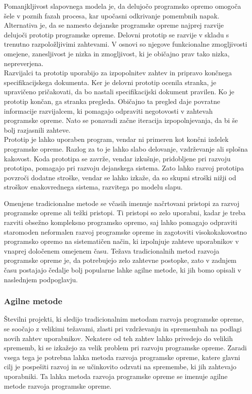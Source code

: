 \documentclass[a4paper,12pt,openright]{book}
\begin{document}
Pomanjkljivost slapovnega modela je, da delujočo programsko opremo omogoča šele v poznih fazah procesa, kar upočasni odkrivanje pomembnih napak. Alternativa je, da se namesto dejanske programske opreme najprej razvije delujoči prototip programske opreme. Delovni prototip se razvije v skladu s trenutno razpoložljivimi zahtevami. V osnovi so njegove  funkcionalne zmogljivosti omejene, zanesljivost je nizka in zmogljivost, ki je običajno prav tako nizka, nepreverjena. \\
Razvijalci ta prototip uporabijo za izpopolnitev zahtev in pripravo končnega specifikacijskega dokumenta. Ker je delovni prototip ocenila stranka, je upravičeno pričakovati, da bo nastali specifikacijski dokument pravilen. Ko je prototip končan, ga stranka pregleda. Običajno ta pregled daje povratne informacije razvijalcem, ki pomagajo odpraviti negotovosti v zahtevah programske opreme. Nato se ponavadi začne iteracija izpopolnjevanja, da bi še bolj razjasnili zahteve. \\
Prototip je lahko uporaben program, vendar ni primeren kot končni izdelek programske opreme. Razlog za to je lahko slabo delovanje, vzdrževanje ali splošna kakovost. Koda prototipa se zavrže, vendar izkušnje, pridobljene pri razvoju prototipa, pomagajo pri razvoju dejanskega sistema. Zato lahko razvoj prototipa povzroči dodatne stroške, vendar se lahko izkaže, da so skupni stroški nižji od stroškov enakovrednega sistema, razvitega po modelu slapu. \cite{aggarwal2005software}

Omenjene tradicionalne metode se včasih imenuje načrtovani pristopi za razvoj programske opreme ali težki pristopi. Ti pristopi so zelo uporabni, kadar je treba razviti obsežno kompleksno programsko opremo, saj lahko pomagajo odpraviti staromoden neformalen razvoj programske opreme in zagotoviti visokokakovostno programsko opremo na sistematičen način, ki izpolnjuje zahteve uporabnikov v vnaprej določenem omejenem času. Težava tradicionalnih metod razvoja programske opreme je, da potrebujejo zelo zahtevne postopke, zato v zadnjem času postajajo čedalje bolj popularne lahke agilne metode, ki jih bomo opisali v naslednjem podpoglavju.


\subsubsection{Agilne metode}
\sloppy
Številni projekti, ki sledijo tradicionalnim metodam razvoja programske opreme, se soočajo z velikimi težavami, zlasti pri vzdrževanju in spremembah na podlagi novih zahtev uporabnikov. Nekatere od teh zahtev lahko privedejo do velikih sprememb, ki se izkažejo za velik problem pri razvoju programske opreme.  Zaradi vsega tega je potrebna lahka metoda razvoja programske opreme, katere glavni cilj je pospešiti razvoj in se učinkovito odzvati na spremembe, ki jih zahtevajo uporabniki. Ta lahka metoda razvoja programske opreme se imenuje agilne metode razvoja programske opreme. 
\cite{AlSaqqa2020AgileSD}
\end{document}
